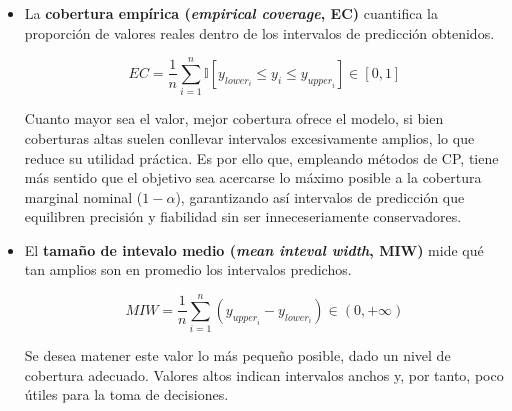 \begin{itemize}
    \item La \textbf{cobertura empírica (\textit{empirical coverage}, EC)} cuantifica la proporción de valores
    reales dentro de los intervalos de predicción obtenidos. 
    
    $$
    EC = \frac{1}{n} 
        \sum_{i=1}^n{ \mathbb{I} \left[ y_{{lower}_i} \le y_i \le y_{{upper}_i} \right] } 
            \in \left[0, 1\right]
    $$

    Cuanto mayor sea el valor, mejor cobertura ofrece el modelo, si bien coberturas altas suelen conllevar 
    intervalos excesivamente amplios, lo que reduce su utilidad práctica. Es por ello que, empleando métodos
    de CP, tiene más sentido que el objetivo sea acercarse lo máximo posible a la cobertura marginal 
    nominal ($1-\alpha$), garantizando así intervalos de predicción que equilibren precisión y fiabilidad sin
    ser inneceseriamente conservadores. 
    
    \item El \textbf{tamaño de intevalo medio (\textit{mean inteval width}, MIW)} mide qué tan amplios son en 
    promedio los intervalos predichos.
    
    $$
    MIW = \frac{1}{n} \sum_{i=1}^n{ \left( y_{{upper}_i} - y_{{lower}_i} \right) } \in (0, +\infty)
    $$
    
    Se desea matener este valor lo más pequeño posible, dado un nivel de cobertura adecuado. Valores altos
    indican intervalos anchos y, por tanto, poco útiles para la toma de decisiones. 




    

\end{itemize}

